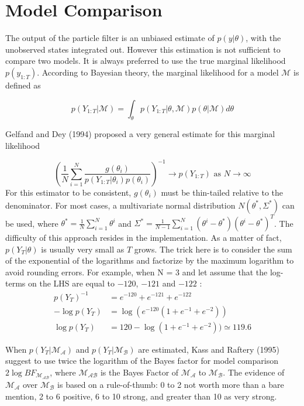 \documentclass[11pt,a4,twosided,singlespacing,titlepagenumber=on]{scrreprt}
\numberwithin{equation}{chapter} %
\theoremstyle{remark}
\begin{document}
\section{Model Comparison}
The output of the particle filter is an unbiased estimate of $p(y|\theta)$, with the unobserved states integrated out. However this estimation is not sufficient to compare two models. It is always preferred to use the true marginal likelihood $p(y_{1:T})$. According to Bayesian theory, the marginal likelihood for a model $\mathcal{M}$ is defined as

$$p(Y_{1:T} | \mathcal{M}) = \int_{\theta} p(Y_{1:T} | \theta, \mathcal{M}) p(\theta | \mathcal{M}) d\theta$$

\noindent
Gelfand and Dey (1994) proposed a very general estimate for this marginal likelihood

$$\left(\frac{1}{N} \sum_{i=1}^N \frac{g(\theta_i)}{p(Y_{1:T} | \theta_i) p(\theta_i)}\right)^{-1} \rightarrow p(Y_{1:T}) \text{ as } N \rightarrow \infty$$
For this estimator to be consistent, $g(\theta_i)$ must be thin-tailed relative to the denominator. For most cases, a multivariate normal distribution $N(\theta^*, \Sigma^*)$ can be used, where $\theta^* = \frac{1}{N} \sum_{i=1}^N \theta^i$ and $\Sigma^* = \frac{1}{N-1} \sum_{i=1}^N \left(\theta^i - \theta^*\right)\left(\theta^i - \theta^*\right)^T$. The difficulty of this approach resides in the implementation. As a matter of fact, $p(Y_T | \theta)$ is usually very small as $T$ grows. The trick here is to consider the sum of the exponential of the logarithms and factorize by the maximum logarithm to avoid rounding errors. For example, when N = 3 and let assume that the log-terms on the LHS are equal to $-120$, $-121$ and $-122$ :
\begin{align*}
p(Y_T)^{-1} &= e^{-120} + e^{-121} + e^{-122} \\
- \log p(Y_T) &= \log (e^{-120} ( 1 + e^{-1} + e^{-2})) \\
 \log p(Y_T) &= 120 - \log ( 1 + e^{-1} + e^{-2})) \simeq 119.6
\end{align*}

\noindent
When $p(Y_T | \mathcal{M_A})$ and $p(Y_T | \mathcal{M_B})$ are estimated, Kass and Raftery (1995) suggest to use twice the logarithm of the Bayes factor for model comparison $2 \log BF_{\mathcal{M_{AB}}}$, where $\mathcal{M_{AB}}$ is the Bayes Factor of $\mathcal{M_A}$ to $\mathcal{M_B}$. The evidence of $\mathcal{M_A}$ over $\mathcal{M_B}$ is based on a rule-of-thumb: 0 to 2 not worth more than a bare mention, 2 to 6 positive, 6 to 10 strong, and greater than 10 as very strong.
\end{document}
